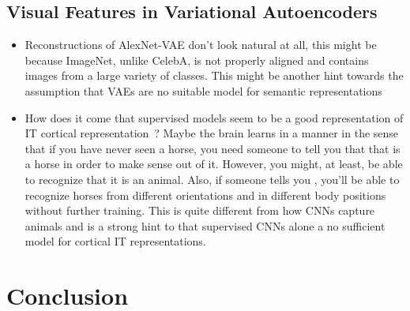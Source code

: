 \documentclass[11pt]{article}
\begin{document}
    \subsection{Visual Features in Variational Autoencoders}\label{subsec:discussion_visual_features_in_variational_autoencoders}
    \begin{itemize}
        \item Reconstructions of AlexNet-VAE don't look natural at all, this might be because ImageNet, unlike CelebA, is not properly aligned and contains images from a large variety of classes.
        This might be another hint towards the assumption that \acp{VAE} are no suitable model for semantic representations
        \item How does it come that supervised models seem to be a good representation of \ac{IT} cortical representation~\citep{khaligh2014deep}? Maybe the brain learns in a  manner in the sense that if you have never seen a horse, you need someone to tell you that that is a horse in order to make sense out of it.
        However, you might, at least, be able to recognize that it is an animal.
        Also, if someone tells you , you'll be able to recognize horses from different orientations and in different body positions without further training.
This is quite different from how \acp{CNN} capture animals and is a strong hint to that supervised \acp{CNN} alone a no sufficient model for cortical IT representations.
\end{itemize}


\section{Conclusion}\label{sec:conclusion}

\newpage
\printbibliography

\newpage
\appendix
\end{document}
